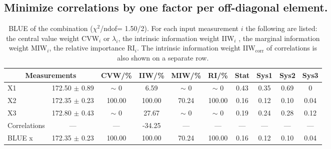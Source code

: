\subsection{Minimize correlations by one factor per off-diagonal element.}
\begin{table}[H]
\scriptsize
\begin{center}
\renewcommand{\arraystretch}{1.1}
\begin{tabular}{|lc|c|c|c|c|cccc|}
\hline
\multicolumn{2}{|c|}{Measurements} & CVW/\%  & IIW/\%  & MIW/\%  & RI/\%  & {\tiny Stat} & {\tiny Sys1} & {\tiny Sys2} & {\tiny Sys3}\\
\hline
X1 &     172.50 $\pm$       0.89 &  {\tiny $\sim$ }0 &       6.59 &  {\tiny $\sim$ }0 &  {\tiny $\sim$ }0 &       0.43 &       0.35 &       0.69 &  0\\
X2 &     172.35 $\pm$       0.23 &     100.00 &     100.00 &      70.24 &     100.00 &       0.16 &       0.12 &       0.10 &       0.04\\
X3 &     172.80 $\pm$       0.43 &  {\tiny $\sim$ }0 &      27.67 &  {\tiny $\sim$ }0 &  {\tiny $\sim$ }0 &       0.19 &       0.24 &       0.28 &       0.12\\
Correlations & --- & --- &     -34.25 & --- & --- & --- & --- & --- & ---\\
\hline
BLUE {\tiny x} &     172.35 $\pm$       0.23 &     100.00 &     100.00 &      70.24 &     100.00 &       0.16 &       0.12 &       0.10 &       0.04\\
\hline
\end{tabular}
\caption{BLUE of the combination ($\chi^2$/ndof=      1.50/2).
 For each input measurement $i$ the following are listed: the central value weight CVW$_i$ or $\lambda_i$, the intrinsic information weight IIW$_i$ , the marginal information weight MIW$_i$, the relative importance RI$_i$. The intrinsic information weight IIW$_{\mathrm{corr}}$ of correlations is also shown on a separate row.}
\renewcommand{\arraystretch}{1}
\end{center}
\end{table}
